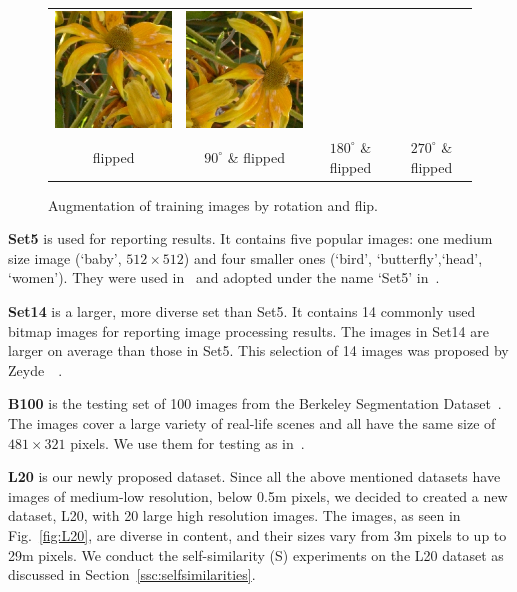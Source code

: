 \documentclass[10pt,twocolumn,letterpaper]{article}
\begin{document}
\begin{figure}
{\begin{tabular}{cccc}
\includegraphics[width=0.22\linewidth, height=0.22\linewidth]{t19rot180ud}&
\includegraphics[width=0.22\linewidth, height=0.22\linewidth]{t19rot270ud}\\
flipped & $90^{\circ}$ \& flipped & $180^{\circ}$ \& flipped & $270^{\circ}$ \& flipped \\
\end{tabular}
}
\caption{Augmentation of training images by rotation and flip.}
\label{fig:augmentation}
\end{figure}

\noindent\textbf{Set5 } is used for reporting results. It contains five popular images: one medium size image (`baby', $512\times512$) and four smaller ones (`bird', `butterfly',`head', `women').
They were used in~\cite{Bevilacqua-BMVC-2012} and adopted under the name `Set5' in~\cite{Timofte-ICCV-2013}.

\noindent\textbf{Set14 } is a larger, more diverse set than Set5. It contains 14 commonly used bitmap images for reporting image processing results. The images in Set14 are larger on average than those in Set5. This selection of 14 images was proposed by Zeyde~\etal~\cite{Zeyde-CS-2012}.

\noindent\textbf{B100 } is the testing set of 100 images from the Berkeley Segmentation Dataset~\cite{Martin-ICCV-2001}. The images cover a large variety of real-life scenes and all have the same size of $481\times321$ pixels. We use them for testing as in~\cite{Timofte-ACCV-2014}.

\noindent\textbf{L20 } is our newly proposed dataset. Since all the above mentioned datasets have images of medium-low resolution, below 0.5m pixels, we decided to created a new dataset, L20, with 20 large high resolution images. The images, as seen in Fig.~\ref{fig:L20}, are diverse in content, and their sizes vary from 3m pixels to up to 29m pixels. We conduct the self-similarity (S) experiments on the L20 dataset as discussed in Section~\ref{ssc:selfsimilarities}.
\end{document}
